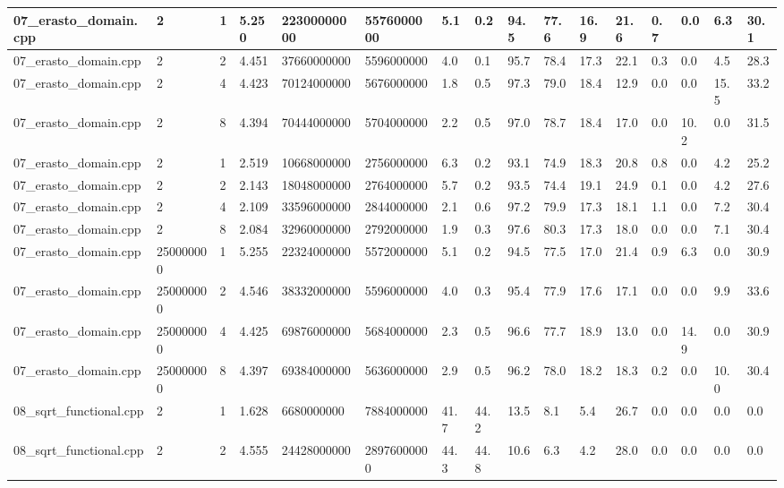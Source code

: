\documentclass[12pt]{article}
\begin{document}
\begin{flushleft}
\begin{tabular}{| l | l | l | l | l | l | l | l | l | l | l | l | l | l | l | l |}
		07\_erasto\_domain.cpp & 2 & 1 & 5.250 & 22300000000 & 5576000000 & 5.1 & 0.2 & 94.5 & 77.6 & 16.9 & 21.6 & 0.7 & 0.0 & 6.3 & 30.1 \\ \hline
		07\_erasto\_domain.cpp & 2 & 2 & 4.451 & 37660000000 & 5596000000 & 4.0 & 0.1 & 95.7 & 78.4 & 17.3 & 22.1 & 0.3 & 0.0 & 4.5 & 28.3 \\ \hline
		07\_erasto\_domain.cpp & 2 & 4 & 4.423 & 70124000000 & 5676000000 & 1.8 & 0.5 & 97.3 & 79.0 & 18.4 & 12.9 & 0.0 & 0.0 & 15.5 & 33.2 \\ \hline
		07\_erasto\_domain.cpp & 2 & 8 & 4.394 & 70444000000 & 5704000000 & 2.2 & 0.5 & 97.0 & 78.7 & 18.4 & 17.0 & 0.0 & 10.2 & 0.0 & 31.5 \\ \hline
		07\_erasto\_domain.cpp & 2 & 1 & 2.519 & 10668000000 & 2756000000 & 6.3 & 0.2 & 93.1 & 74.9 & 18.3 & 20.8 & 0.8 & 0.0 & 4.2 & 25.2 \\ \hline
		07\_erasto\_domain.cpp & 2 & 2 & 2.143 & 18048000000 & 2764000000 & 5.7 & 0.2 & 93.5 & 74.4 & 19.1 & 24.9 & 0.1 & 0.0 & 4.2 & 27.6 \\ \hline
		07\_erasto\_domain.cpp & 2 & 4 & 2.109 & 33596000000 & 2844000000 & 2.1 & 0.6 & 97.2 & 79.9 & 17.3 & 18.1 & 1.1 & 0.0 & 7.2 & 30.4 \\ \hline
		07\_erasto\_domain.cpp & 2 & 8 & 2.084 & 32960000000 & 2792000000 & 1.9 & 0.3 & 97.6 & 80.3 & 17.3 & 18.0 & 0.0 & 0.0 & 7.1 & 30.4 \\ \hline
		07\_erasto\_domain.cpp & 250000000 & 1 & 5.255 & 22324000000 & 5572000000 & 5.1 & 0.2 & 94.5 & 77.5 & 17.0 & 21.4 & 0.9 & 6.3 & 0.0 & 30.9 \\ \hline
		07\_erasto\_domain.cpp & 250000000 & 2 & 4.546 & 38332000000 & 5596000000 & 4.0 & 0.3 & 95.4 & 77.9 & 17.6 & 17.1 & 0.0 & 0.0 & 9.9 & 33.6 \\ \hline
		07\_erasto\_domain.cpp & 250000000 & 4 & 4.425 & 69876000000 & 5684000000 & 2.3 & 0.5 & 96.6 & 77.7 & 18.9 & 13.0 & 0.0 & 14.9 & 0.0 & 30.9 \\ \hline
		07\_erasto\_domain.cpp & 250000000 & 8 & 4.397 & 69384000000 & 5636000000 & 2.9 & 0.5 & 96.2 & 78.0 & 18.2 & 18.3 & 0.2 & 0.0 & 10.0 & 30.4 \\ \hline
		08\_sqrt\_functional.cpp & 2 & 1 & 1.628 & 6680000000 & 7884000000 & 41.7 & 44.2 & 13.5 & 8.1 & 5.4 & 26.7 & 0.0 & 0.0 & 0.0 & 0.0 \\ \hline
		08\_sqrt\_functional.cpp & 2 & 2 & 4.555 & 24428000000 & 28976000000 & 44.3 & 44.8 & 10.6 & 6.3 & 4.2 & 28.0 & 0.0 & 0.0 & 0.0 & 0.0 \\ \hline

\end{tabular}
\end{flushleft}
\end{document}
